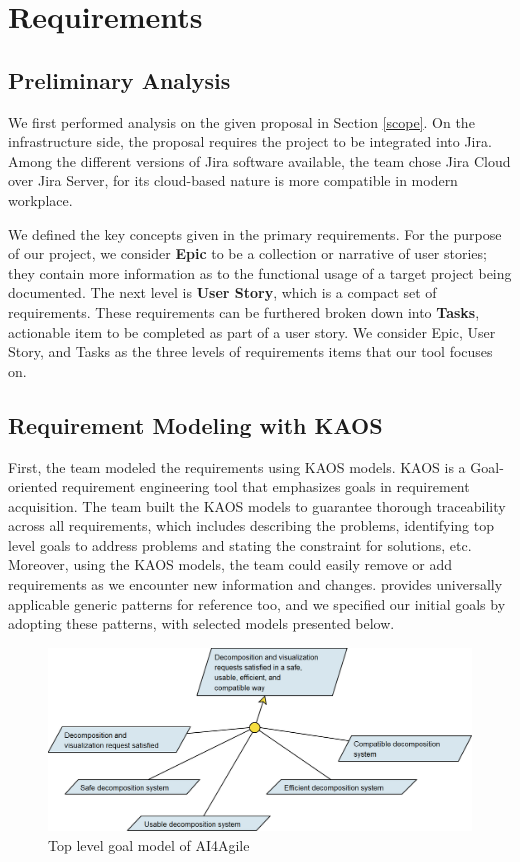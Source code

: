 \section{Requirements}
\label{requirement}

\subsection{Preliminary Analysis}
We first performed analysis on the given proposal in Section \ref{scope}. On the infrastructure side, the proposal requires the project to be integrated into Jira. Among the different versions of Jira software available, the team chose Jira Cloud over Jira Server, for its cloud-based nature is more compatible in modern workplace. 

We defined the key concepts given in the primary requirements. For the purpose of our project, we consider
\textbf{Epic} to be a collection or narrative of user stories; they contain more information as to the functional usage of a target project being documented. The next level is \textbf{User Story}, which is a compact set of requirements. These requirements can be furthered broken down into \textbf{Tasks}, actionable item to be completed as part of a user story. 
We consider Epic, User Story, and Tasks as the three levels of requirements items that our tool focuses on. 

\subsection{Requirement Modeling with KAOS}
First, the team modeled the requirements using KAOS models\cite{KAOS}. KAOS is a Goal-oriented requirement engineering \cite{GOAL} tool that emphasizes goals in requirement acquisition. The team built the KAOS models to guarantee thorough traceability across all requirements, which includes describing the problems, identifying top level goals to address problems and stating the constraint for solutions, etc. Moreover, using the KAOS models, the team could easily remove or add requirements as we encounter new information and changes. \cite{KAOS} provides universally applicable generic patterns for reference too, and we specified our initial goals by adopting these patterns, with selected models presented below.

\begin{figure}
\centering
\includegraphics[width=\textwidth,keepaspectratio]{./figure/GoalsNFR1.png}
\caption{Top level goal model of AI4Agile}
\label{goal1}
\end{figure}

